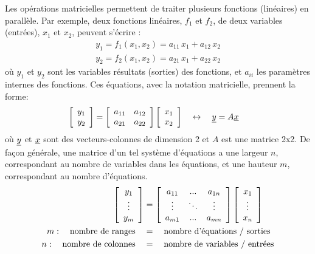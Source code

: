 Les opérations matricielles permettent de traiter plusieurs fonctions (linéaires) en parallèle. Par exemple, deux fonctions linéaires, $f_1$ et $f_2$, de deux variables (entrées), $x_1$ et $x_2$, peuvent s’écrire :
%
\begin{align}
	y_1 = f_1(x_1,x_2) = a_{11} \, x_1 + a_{12} \, x_2   \\
	y_2 = f_2(x_1,x_2) = a_{21} \, x_1 + a_{22} \, x_2
\end{align}
%
où $y_1$ et $y_2$ sont les variables résultats (sorties) des fonctions, et $a_{ii}$ les paramètres internes des fonctions. Ces équations, avec la notation matricielle, prennent la forme:
%
\begin{align}
	\left[ \begin{array}{c}
			   y_1 \\ y_2
	\end{array} \right] &=
	\left[ \begin{array}{c c}
			   a_{11} & a_{12} \\ a_{21} & a_{22}
	\end{array} \right]
	\left[ \begin{array}{c}
			   x_1 \\ x_2
	\end{array} \right] \quad \leftrightarrow \quad  \underline{y}  =   A  \underline{x}
	\label{eq:sys2}
\end{align}
%
où $\underline{y}$ et $\underline{x}$ sont des vecteurs-colonnes de dimension 2 et $A$ est une matrice 2x2. De façon générale, une matrice d'un tel système d’équations a une largeur $n$, correspondant au nombre de variables dans les équations, et une hauteur $m$, correspondant au nombre d’équations.
%
\begin{align}
	\left[ \begin{array}{c}
			   y_1 \\ \vdots \\ y_m
	\end{array} \right] &=
	\left[ \begin{array}{c c c}
			   a_{11} & ... & a_{1n} \\ \vdots & \ddots  &  \vdots \\
			   a_{m1} & ... & a_{mn}
	\end{array} \right]
	\left[ \begin{array}{c}
			   x_1 \\ \vdots \\ x_n
	\end{array} \right] \\
	m: \quad \text{nombre de ranges} \quad&=\quad \text{nombre d’équations / sorties} \\
	n: \quad \text{nombre de colonnes} \quad&=\quad \text{nombre de variables / entrées}
\end{align}
%


